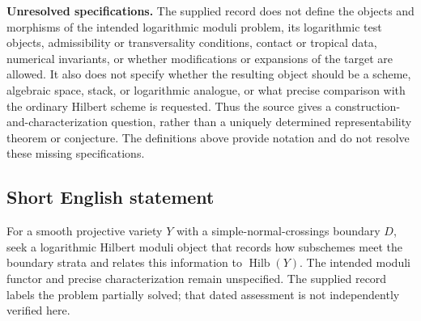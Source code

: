 \documentclass[11pt]{article}
\begin{document}
\textbf{Unresolved specifications.} The supplied record does not define the objects and morphisms of the intended logarithmic moduli problem, its logarithmic test objects, admissibility or transversality conditions, contact or tropical data, numerical invariants, or whether modifications or expansions of the target are allowed. It also does not specify whether the resulting object should be a scheme, algebraic space, stack, or logarithmic analogue, or what precise comparison with the ordinary Hilbert scheme is requested. Thus the source gives a construction-and-characterization question, rather than a uniquely determined representability theorem or conjecture. The definitions above provide notation and do not resolve these missing specifications.
\subsection{Short English statement}
For a smooth projective variety \(Y\) with a simple-normal-crossings boundary \(D\), seek a logarithmic Hilbert moduli object that records how subschemes meet the boundary strata and relates this information to \(\operatorname{Hilb}(Y)\). The intended moduli functor and precise characterization remain unspecified. The supplied record labels the problem partially solved; that dated assessment is not independently verified here.
\end{document}
